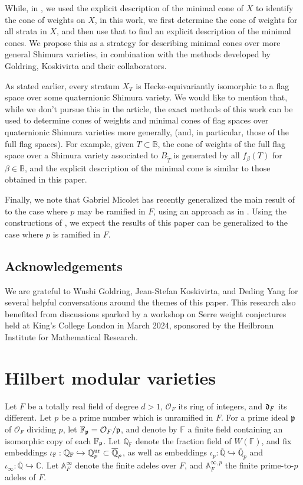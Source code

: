 \documentclass[11pt,pdflatex]{amsart}
\theoremstyle{plain}
\theoremstyle{definition}
\newcommand{\CC}{\mathbf{C}}
\newcommand{\FF}{\mathbf{F}}
\newcommand{\QQ}{\mathbf{Q}}
\theoremstyle{plain}
\theoremstyle{definition}
\theoremstyle{remark}
\numberwithin{equation}{section}
\numberwithin{figure}{section} \numberwithin{table}{subsection}
\newcommand{\gerd}{{\frak{d}}}
\newcommand{\gerp}{{\frak{p}}}
\newcommand{\calO}{{\mathcal{O}}}
\def\AA{\mathbb{A}}
\def\BB{\mathbb{B}}
\def\CC{\mathbb{C}}
\def\FF{\mathbb{F}}
\def\QQ{\mathbb{Q}}
\newcommand{\Qpbar}{\overline{\QQ}_p}
\begin{document}
While, in \cite{DK1,DK2}, we used the explicit description of the minimal cone of $X$ to identify the cone of weights on $X$, in this work, we first determine the cone of weights for all strata in $X$, and then use that to find an explicit description of the minimal cones. We propose this as a strategy for describing minimal cones over more general Shimura varieties, in combination with the methods developed by Goldring, Koskivirta and their collaborators.

As stated earlier, every stratum $X_T$ is Hecke-equivariantly isomorphic to a flag space over some quaternionic Shimura variety. We would like to mention that, while we don't pursue this in the article, the exact methods of this work can be used to determine cones of weights and minimal cones of flag spaces over quaternionic Shimura varieties more generally, (and, in particular, those of the full flag spaces). For example, given $T \subset \BB$, the cone of weights of the full flag space over a Shimura variety associated to $B_{\tilde{T}}$  is generated by all $f_\beta(T)$ for $\beta \in \BB$, and the explicit description of the minimal cone is similar to those obtained in this paper.

Finally, we note that Gabriel Micolet \cite{M} has recently generalized the main result of \cite{TX} to the case where $p$ may be ramified in $F$, using an approach as in \cite{DKS}.  Using the constructions of \cite{M}, we expect the results of this paper can be generalized to the case where $p$ is ramified in $F$.


 \subsection{Acknowledgements}  We are grateful to Wushi Goldring, Jean-Stefan Koskivirta, and Deding Yang for several helpful conversations around the themes of this paper. This research also benefited from discussions sparked by a workshop on Serre weight conjectures held at King's College London in March 2024, sponsored by the Heilbronn Institute for Mathematical Research. 



 


 
 \section{Hilbert modular varieties}\label{section: HMV}

 Let $F$ be a totally real field of degree $d>1$, $\calO_F$ its ring of integers, and $\gerd_F$ its different. Let $p$ be a prime number which is unramified in $F$. For a  prime ideal $\gerp$  of $\calO_F$ dividing $p$, let $\FF_\gerp = \calO_F/\gerp$, and denote by  $\FF$ a finite field containing an isomorphic copy of each $\FF_\gerp$. Let $\QQ_\FF$ denote the fraction field of $W(\FF)$, and fix embeddings $\iota_\FF: \mathbb{Q}_\FF \hookrightarrow \QQ_p^{\rm ur}
 \subset \Qpbar$, as well as embeddings $\iota_p:\overline{\QQ} \hookrightarrow \overline{\QQ}_p $ and
 $\iota_\infty: \overline{\QQ} \hookrightarrow \CC$. Let $\AA^\infty_F$ denote the finite adeles over $F$, and 
$\AA_F^{\infty, p}$ the finite prime-to-$p$ adeles of $F$.
\end{document}
